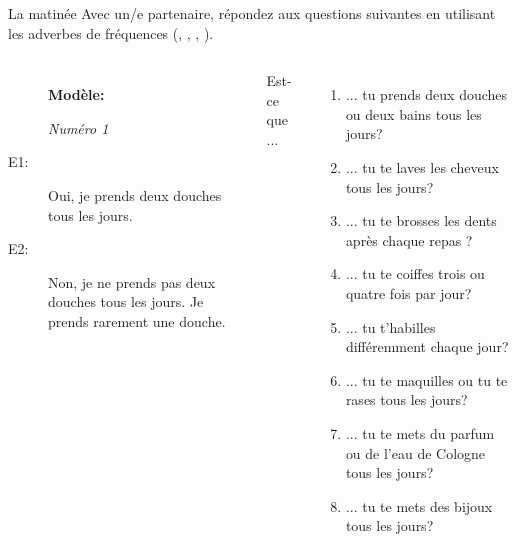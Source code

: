 \documentclass{beamer}
\begin{document}
  \begin{frame}{La matinée}
    \small
    Avec un/e partenaire, répondez aux questions suivantes en utilisant les adverbes de fréquences (, , , ). \\
    \begin{columns}
      \scriptsize
        \begin{description}
          \item[] \textbf{Modèle:}
          \item[] \emph{Numéro 1}
          \item[E1:] Oui, je prends deux douches tous les jours.
          \item[] 
          \item[E2:] Non, je ne prends pas deux douches tous les jours. Je prends rarement une douche.
          \item[] 
        \end{description}
        Est-ce que ...
        \begin{enumerate}
          \item ... tu prends deux douches ou deux bains tous les jours?
          \item ... tu te laves les cheveux tous les jours?
          \item ... tu te brosses les dents après chaque repas ?
          \item ... tu te coiffes trois ou quatre fois par jour?
          \item ... tu t'habilles différemment chaque jour?
          \item ... tu te maquilles ou tu te rases tous les jours?
          \item ... tu te mets du parfum ou de l'eau de Cologne tous les jours?
          \item ... tu te mets des bijoux  tous les jours?
        \end{enumerate}
    \end{columns}
  \end{frame}
\end{document}
